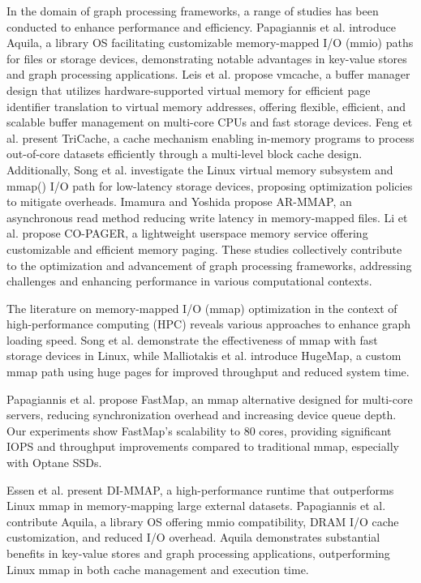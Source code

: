 In the domain of graph processing frameworks, a range of studies has been conducted to enhance performance and efficiency. Papagiannis et al. \cite{papagiannis2021memory} introduce Aquila, a library OS facilitating customizable memory-mapped I/O (mmio) paths for files or storage devices, demonstrating notable advantages in key-value stores and graph processing applications. Leis et al. \cite{leis2023virtual} propose vmcache, a buffer manager design that utilizes hardware-supported virtual memory for efficient page identifier translation to virtual memory addresses, offering flexible, efficient, and scalable buffer management on multi-core CPUs and fast storage devices. Feng et al. \cite{feng2023tricache} present TriCache, a cache mechanism enabling in-memory programs to process out-of-core datasets efficiently through a multi-level block cache design. Additionally, Song et al. \cite{song2012low} investigate the Linux virtual memory subsystem and mmap() I/O path for low-latency storage devices, proposing optimization policies to mitigate overheads. Imamura and Yoshida \cite{imamura2019poster} propose AR-MMAP, an asynchronous read method reducing write latency in memory-mapped files. Li et al. \cite{li2019userland} propose CO-PAGER, a lightweight userspace memory service offering customizable and efficient memory paging. These studies collectively contribute to the optimization and advancement of graph processing frameworks, addressing challenges and enhancing performance in various computational contexts.

The literature on memory-mapped I/O (mmap) optimization in the context of high-performance computing (HPC) reveals various approaches to enhance graph loading speed. Song et al. \cite{song2016efficient} demonstrate the effectiveness of mmap with fast storage devices in Linux, while Malliotakis et al. \cite{malliotakis2021hugemap} introduce HugeMap, a custom mmap path using huge pages for improved throughput and reduced system time.

Papagiannis et al. \cite{papagiannis2020optimizing} propose FastMap, an mmap alternative designed for multi-core servers, reducing synchronization overhead and increasing device queue depth. Our experiments show FastMap's scalability to 80 cores, providing significant IOPS and throughput improvements compared to traditional mmap, especially with Optane SSDs.

Essen et al. \cite{van2015di} present DI-MMAP, a high-performance runtime that outperforms Linux mmap in memory-mapping large external datasets. Papagiannis et al. \cite{papagiannis2021memory} contribute Aquila, a library OS offering mmio compatibility, DRAM I/O cache customization, and reduced I/O overhead. Aquila demonstrates substantial benefits in key-value stores and graph processing applications, outperforming Linux mmap in both cache management and execution time.

